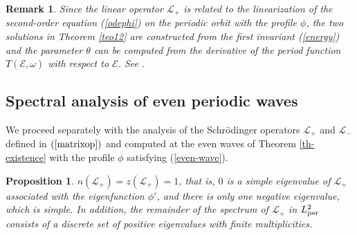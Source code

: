 \documentclass[12pt,reqno]{amsart}
\numberwithin{equation}{section}
\numberwithin{figure}{section}
\newtheorem{proposition}[theorem]{Proposition}
\newtheorem{remark}[theorem]{Remark}
\begin{document}
\begin{remark}
Since the linear operator $\mathcal{L}_+$ is related to the linearization 
of the second-order equation (\ref{odephi}) on the periodic orbit with the profile $\phi$, the two solutions in Theorem \ref{teo12} are constructed from the first invariant (\ref{energy}) and the 
parameter $\theta$ can be computed from the derivative of the period 
function $T(\mathcal{E},\omega)$ with respect to $\mathcal{E}$. See \cite[Section 3.2]{GeyerPel25}. 	
\end{remark}
		
\subsection{Spectral analysis of even periodic waves}
		
We proceed separately with the analysis of the Schr\"{o}dinger operators $\mathcal{L}_+$ and $\mathcal{L}_-$ defined in $(\ref{matrixop})$ and computed at the even waves of Theorem \ref{th-existence} with the profile $\phi$ satisfying (\ref{even-wave}). 

		
\begin{proposition}\label{propR0}
$n(\mathcal{L}_+) = z(\mathcal{L}_+) = 1$, that is, 
$0$ is a simple eigenvalue of $\mathcal{L}_{+}$ associated with the eigenfunction $\phi'$, and there is only one negative eigenvalue, which is simple. In addition, the remainder of the spectrum of $\mathcal{L}_+$ in $L^2_{\rm per}$ consists of a discrete set of positive eigenvalues with finite multiplicities.
\end{proposition}
\end{document}
